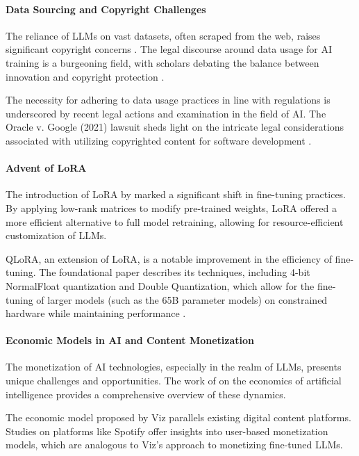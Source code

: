 \documentclass{article}
\begin{document}
\paragraph{Data Sourcing and Copyright Challenges} The reliance of LLMs on vast datasets, often scraped from the web, raises significant copyright concerns \citep{GaonAviv2021Tfoc}. The legal discourse around data usage for AI training is a burgeoning field, with scholars debating the balance between innovation and copyright protection \citep{10.1093/oso/9780190246693.001.0001}.

The necessity for adhering to data usage practices in line with regulations is underscored by recent legal actions and examination in the field of AI. The Oracle v. Google (2021) lawsuit sheds light on the intricate legal considerations associated with utilizing copyrighted content for software development \citep{enwiki:1187395454}.

\paragraph{Advent of LoRA} The introduction of LoRA by \citep{hu2021lora} marked a significant shift in fine-tuning practices. By applying low-rank matrices to modify pre-trained weights, LoRA offered a more efficient alternative to full model retraining, allowing for resource-efficient customization of LLMs.

QLoRA, an extension of LoRA, is a notable improvement in the efficiency of fine-tuning. The foundational paper describes its techniques, including 4-bit NormalFloat quantization and Double Quantization, which allow for the fine-tuning of larger models (such as the 65B parameter models) on constrained hardware while maintaining performance \citep{dettmers2023qlora}.

\paragraph{Economic Models in AI and Content Monetization}The monetization of AI technologies, especially in the realm of LLMs, presents unique challenges and opportunities. The work of \citep{10.7208/chicago/9780226613475.001.0001} on the economics of artificial intelligence provides a comprehensive overview of these dynamics.

The economic model proposed by Viz parallels existing digital content platforms. Studies on platforms like Spotify \citep{NBERw24713} offer insights into user-based monetization models, which are analogous to Viz's approach to monetizing fine-tuned LLMs.
\end{document}

